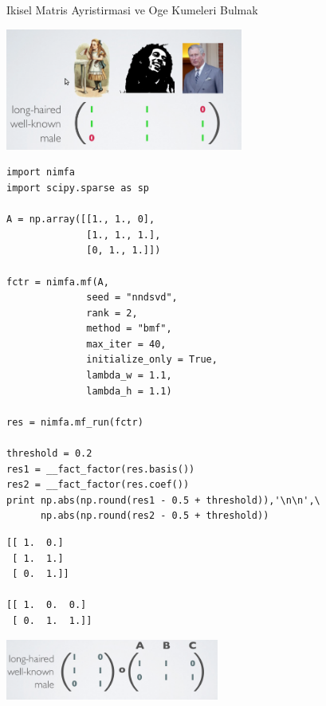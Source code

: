 \documentclass[12pt,fleqn]{article}\usepackage{../common}
\begin{document}
Ikisel Matris Ayristirmasi ve Oge Kumeleri Bulmak

\includegraphics[height=4cm]{abc.png}

\begin{verbatim}
import nimfa
import scipy.sparse as sp

A = np.array([[1., 1., 0],
              [1., 1., 1.],
              [0, 1., 1.]])

fctr = nimfa.mf(A,
              seed = "nndsvd", 
              rank = 2, 
              method = "bmf", 
              max_iter = 40, 
              initialize_only = True,
              lambda_w = 1.1,
              lambda_h = 1.1)

res = nimfa.mf_run(fctr)

threshold = 0.2
res1 = __fact_factor(res.basis())
res2 = __fact_factor(res.coef())
print np.abs(np.round(res1 - 0.5 + threshold)),'\n\n',\
      np.abs(np.round(res2 - 0.5 + threshold))
\end{verbatim}

\begin{verbatim}
[[ 1.  0.]
 [ 1.  1.]
 [ 0.  1.]] 

[[ 1.  0.  0.]
 [ 0.  1.  1.]]
\end{verbatim}

\includegraphics[height=2cm]{abc_res.png}
\end{document}

